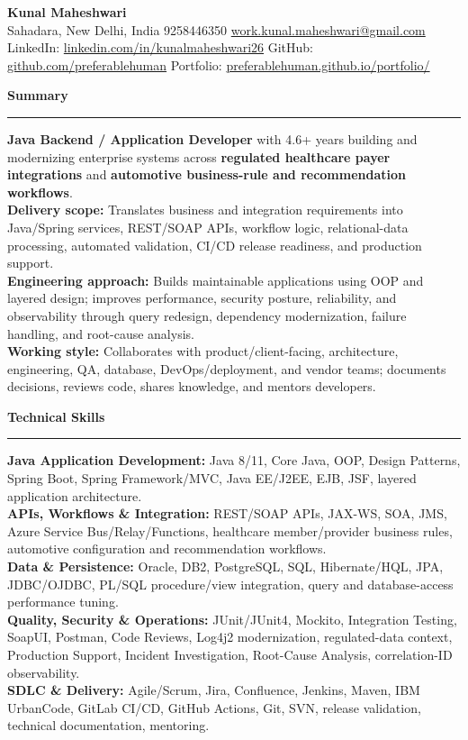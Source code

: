 \documentclass[11pt,letterpaper]{article}
\newcommand{\ressection}[1]{\Needspace{5\baselineskip}\vspace{8pt}\par\textbf{#1}\par\vspace{2pt}\hrule\vspace{5pt}}
\begin{document}
\pagestyle{empty}\raggedright\fontsize{11}{12.5}\selectfont

{\Large \textbf{Kunal Maheshwari}}\\
Sahadara, New Delhi, India \textbar{} 9258446350 \textbar{} \href{mailto:work.kunal.maheshwari@gmail.com}{work.kunal.maheshwari@gmail.com}\\
LinkedIn: \href{https://www.linkedin.com/in/kunalmaheshwari26}{linkedin.com/in/kunalmaheshwari26} \textbar{} GitHub: \href{https://github.com/preferablehuman}{github.com/preferablehuman} \textbar{} Portfolio: \href{https://preferablehuman.github.io/portfolio/}{preferablehuman.github.io/portfolio/}

\ressection{Summary}
\textbf{Java Backend / Application Developer} with 4.6+ years building and modernizing enterprise systems across \textbf{regulated healthcare payer integrations} and \textbf{automotive business-rule and recommendation workflows}.\\[2pt]
\textbf{Delivery scope:} Translates business and integration requirements into Java/Spring services, REST/SOAP APIs, workflow logic, relational-data processing, automated validation, CI/CD release readiness, and production support.\\[2pt]
\textbf{Engineering approach:} Builds maintainable applications using OOP and layered design; improves performance, security posture, reliability, and observability through query redesign, dependency modernization, failure handling, and root-cause analysis.\\[2pt]
\textbf{Working style:} Collaborates with product/client-facing, architecture, engineering, QA, database, DevOps/deployment, and vendor teams; documents decisions, reviews code, shares knowledge, and mentors developers.

\ressection{Technical Skills}
\textbf{Java Application Development:} Java 8/11, Core Java, OOP, Design Patterns, Spring Boot, Spring Framework/MVC, Java EE/J2EE, EJB, JSF, layered application architecture.\\
\textbf{APIs, Workflows \& Integration:} REST/SOAP APIs, JAX-WS, SOA, JMS, Azure Service Bus/Relay/Functions, healthcare member/provider business rules, automotive configuration and recommendation workflows.\\
\textbf{Data \& Persistence:} Oracle, DB2, PostgreSQL, SQL, Hibernate/HQL, JPA, JDBC/OJDBC, PL/SQL procedure/view integration, query and database-access performance tuning.\\
\textbf{Quality, Security \& Operations:} JUnit/JUnit4, Mockito, Integration Testing, SoapUI, Postman, Code Reviews, Log4j2 modernization, regulated-data context, Production Support, Incident Investigation, Root-Cause Analysis, correlation-ID observability.\\
\textbf{SDLC \& Delivery:} Agile/Scrum, Jira, Confluence, Jenkins, Maven, IBM UrbanCode, GitLab CI/CD, GitHub Actions, Git, SVN, release validation, technical documentation, mentoring.
\end{document}
